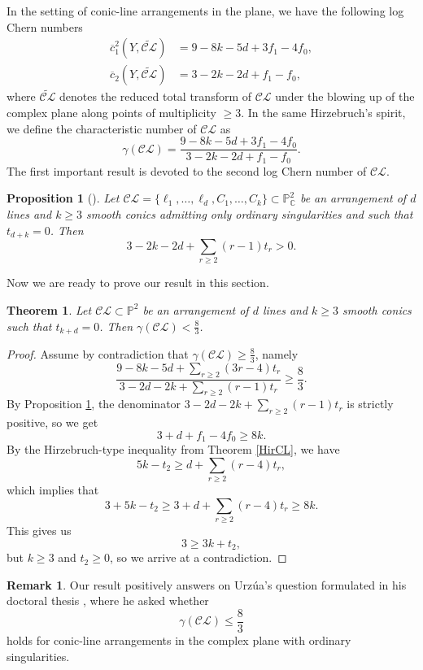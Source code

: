 \documentclass{article}
\theoremstyle{plain}
\newtheorem{theorem}[thm]{Theorem}
\newtheorem{proposition}[thm]{Proposition}
\theoremstyle{definition}
\newtheorem{remark}[thm]{Remark}
\numberwithin{equation}{section}
\begin{document}
In the setting of conic-line arrangements in the plane, we have the following log Chern numbers
\begin{align*}
\overline{c}_{1}^{2}(Y, \widetilde{\mathcal{CL}})&= 9 - 8k - 5d + 3f_{1} - 4f_{0},\\    
\overline{c}_{2}(Y, \widetilde{\mathcal{CL}}) &= 3 -2k - 2d + f_{1} - f_{0},
\end{align*}
where $\widetilde{\mathcal{CL}}$ denotes the reduced total transform of $\mathcal{CL}$ under the blowing up of the complex plane along points of multiplicity $\geq 3$. In the same Hirzebruch's spirit, we define the characteristic number of $\mathcal{CL}$ as
\begin{equation}
\gamma(\mathcal{CL}) = \dfrac{9 - 8k - 5d + 3f_{1} -4f_{0}}{3 -2k - 2d + f_{1} - f_{0}}.
\end{equation}
The first important result is devoted to the second log Chern number of $\mathcal{CL}$.
\begin{proposition}[{\cite[Proposition 3.8]{RPPP}}]
\label{prop: c2}
Let $\mathcal{CL} = \{\ell_{1}, \ldots, \ell_{d}, C_{1}, \ldots, C_{k}\} \subset \mathbb{P}^{2}_{\mathbb{C}}$ be an arrangement of $d$ lines and $k\geq 3$ smooth conics admitting only ordinary singularities and such that $t_{d+k}=0$. 
Then
\[3-2k-2d+\sum_{r\geq 2}(r-1)t_{r}>0.\] 
\end{proposition}
Now we are ready to prove our result in this section.
\begin{theorem}
\label{charn}
Let $\mathcal{CL} \subset \mathbb{P}^{2}$ be an arrangement of $d$ lines and $k\geq 3$ smooth conics such that $t_{k+d}=0$. Then $\gamma(\mathcal{CL}) < \frac{8}{3}$.
\end{theorem}
\begin{proof}
 Assume by contradiction that $\gamma(\mathcal{CL}) \geq \frac{8}{3}$, namely 
\[\frac{9-8k-5d + \sum_{r\geq 2}(3r-4)t_{r}}{3-2d-2k + \sum_{r\geq 2}(r-1)t_{r}}\geq \frac{8}{3}.\]
By  Proposition \ref{prop: c2}, the denominator $3-2d-2k+ \sum_{r\geq 2}(r-1)t_{r}$ is strictly positive, so we get 
\[3+d+f_{1}-4f_{0}\geq 8k.\]
By the Hirzebruch-type inequality from Theorem \ref{HirCL}, we have 
\[5k-t_{2}\geq d+ \sum_{r\geq 2}(r-4)t_{r},\]
which implies that
\[3+5k-t_{2} \geq 3+d+\sum_{r\geq 2}(r-4)t_{r} \geq 8k.\]
This gives us
\[3\geq 3k+t_{2},\]
but $k\geq 3$ and $t_{2}\geq 0$, so we arrive at a contradiction.
\end{proof}
\begin{remark}
Our result positively answers on Urz\'ua's question formulated in his doctoral thesis \cite[Section 2.5.1]{Urzua}, where he asked whether
\[\gamma(\mathcal{CL}) \leq \frac{8}{3}\]
holds for conic-line arrangements in the complex plane with ordinary singularities.
\end{remark}
\end{document}
